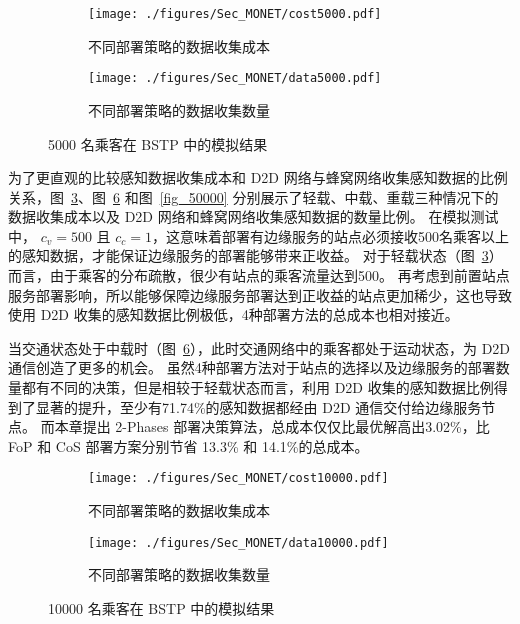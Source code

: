 \begin{figure}[!b]
  \centering
  \begin{subfigure}[b]{0.45\linewidth}
    \texttt{[image: ./figures/Sec\_MONET/cost5000.pdf]}
    \label{fig_cost5000}
    \vspace{-2em}
    \caption{不同部署策略的数据收集成本}
  \end{subfigure}
  \begin{subfigure}[b]{0.45\linewidth}
    \texttt{[image: ./figures/Sec\_MONET/data5000.pdf]}
    \label{fig_data5000}
    \vspace{-2em}
    \caption{不同部署策略的数据收集数量}
  \end{subfigure}
    \vspace{-0.5em}
    \caption{5000 名乘客在 BSTP 中的模拟结果}
  \label{fig_5000}
\end{figure}

为了更直观的比较感知数据收集成本和 D2D 网络与蜂窝网络收集感知数据的比例关系，图~\ref{fig_5000}、图~\ref{fig_10000} 和图~\ref{fig_50000} 分别展示了轻载、中载、重载三种情况下的数据收集成本以及 D2D 网络和蜂窝网络收集感知数据的数量比例。
在模拟测试中， $c_v = 500$ 且 $c_c = 1$，这意味着部署有边缘服务的站点必须接收500名乘客以上的感知数据，才能保证边缘服务的部署能够带来正收益。
对于轻载状态（图~\ref{fig_5000}）而言，由于乘客的分布疏散，很少有站点的乘客流量达到500。
再考虑到前置站点服务部署影响，所以能够保障边缘服务部署达到正收益的站点更加稀少，这也导致使用 D2D 收集的感知数据比例极低，4种部署方法的总成本也相对接近。


当交通状态处于中载时（图~\ref{fig_10000}），此时交通网络中的乘客都处于运动状态，为 D2D 通信创造了更多的机会。
虽然4种部署方法对于站点的选择以及边缘服务的部署数量都有不同的决策，但是相较于轻载状态而言，利用 D2D 收集的感知数据比例得到了显著的提升，至少有71.74\%的感知数据都经由 D2D 通信交付给边缘服务节点。
而本章提出 2-Phases 部署决策算法，总成本仅仅比最优解高出3.02\%，比 FoP 和 CoS 部署方案分别节省 13.3\% 和 14.1\%的总成本。

\begin{figure}[!h]
  \centering
  \begin{subfigure}[b]{0.45\linewidth}
    \texttt{[image: ./figures/Sec\_MONET/cost10000.pdf]}
    \label{fig_cost10000}
    \vspace{-2em}
    \caption{不同部署策略的数据收集成本}
  \end{subfigure}
  \begin{subfigure}[b]{0.45\linewidth}
    \texttt{[image: ./figures/Sec\_MONET/data10000.pdf]}
    \label{fig_data10000}
    \vspace{-2em}
    \caption{不同部署策略的数据收集数量}
  \end{subfigure}
    \vspace{-0.5em}
    \caption{10000 名乘客在 BSTP 中的模拟结果}
  \label{fig_10000}
\end{figure}

